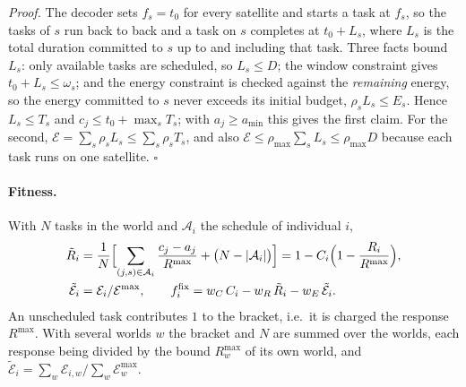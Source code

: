 \emph{Proof.} The decoder sets $f_s=t_0$ for every satellite and starts a task
at $f_s$, so the tasks of $s$ run back to back and a task on $s$ completes at
$t_0+L_s$, where $L_s$ is the total duration committed to $s$ up to and
including that task. Three facts bound $L_s$: only available tasks are
scheduled, so $L_s\le D$; the window constraint gives $t_0+L_s\le\omega_s$; and
the energy constraint is checked against the \emph{remaining} energy, so the
energy committed to $s$ never exceeds its initial budget, $\rho_sL_s\le E_s$.
Hence $L_s\le T_s$ and $c_j\le t_0+\max_sT_s$; with $a_j\ge a_{\min}$ this gives
the first claim. For the second, $\mathcal{E}=\sum_s\rho_sL_s\le\sum_s\rho_sT_s$,
and also $\mathcal{E}\le\rho_{\max}\sum_sL_s\le\rho_{\max}D$ because each task
runs on one satellite. \hfill$\square$

\paragraph{Fitness.} With $N$ tasks in the world and $\mathcal{A}_i$ the schedule
of individual $i$,
\begin{align}
  \tilde R_i &= \frac1N\Bigl[\sum_{(j,s)\in\mathcal{A}_i}\frac{c_j-a_j}{R^{\max}}
                 +\bigl(N-|\mathcal{A}_i|\bigr)\Bigr]
              = 1-C_i\Bigl(1-\frac{R_i}{R^{\max}}\Bigr), \label{eq:Rtilde}\\
  \tilde{\mathcal{E}}_i &= \mathcal{E}_i/\mathcal{E}^{\max},\qquad
  f^{\mathrm{fix}}_i = w_C\,C_i-w_R\,\tilde R_i-w_E\,\tilde{\mathcal{E}}_i . \label{eq:ffix}
\end{align}
An unscheduled task contributes $1$ to the bracket, i.e.\ it is charged the
response $R^{\max}$. With several worlds $w$ the bracket and $N$ are summed over
the worlds, each response being divided by the bound $R^{\max}_w$ of its own
world, and $\tilde{\mathcal{E}}_i=\sum_w\mathcal{E}_{i,w}/\sum_w\mathcal{E}^{\max}_w$.

